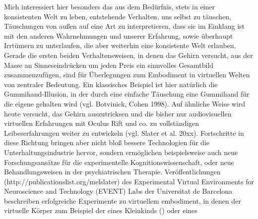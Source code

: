 \documentclass[a4paper]{article}
\begin{document}
Mich interessiert hier besonders das aus dem Bedürfnis, stets in einer konsistenten Welt zu leben, entstehende Verhalten, uns selbst zu täuschen, Täuschungen von außen auf eine Art zu interpretieren, dass sie im Einklang ist mit den anderen Wahrnehmungen und unserer Erfahrung, sowie überhaupt Irrtümern zu unterlaufen, die aber weiterhin eine konsistente Welt erlauben. Gerade die ersten beiden Verhaltensweisen, in denen das Gehirn versucht, aus der Masse an Sinneseindrücken um jeden Preis ein sinnvolles Gesamtbild zusammenzufügen, sind für Überlegungen zum Embodiment in virtuellen Welten von zentraler Bedeutung. Ein klassisches Beispiel ist hier natürlich die Gummihand-Illusion, in der durch eine einfache Täuschung eine Gummihand für die eigene gehalten wird (vgl. Botvinick, Cohen 1998). Auf ähnliche Weise wird heute versucht, das Gehirn auszutricksen und die bisher nur audiovisuellen virtuellen Erfahrungen mit Oculus Rift und co. zu vollständigen Leibeserfahrungen weiter zu entwickeln (vgl. Slater et al. 20xx). Fortschritte in diese Richtung bringen aber nicht bloß bessere Technologien für die Unterhaltungsindustrie hervor, sondern ermöglichen beispielsweise auch neue Forschungsansätze für die experimentelle Kognitionswissenschaft, oder neue Behandlungsweisen in der psychiatrischen Therapie. Veröffentlichungen (http://publicationslist.org/melslater) des Experimental Virtual Environments for Neuroscience and Technology (EVENT) Labs der Universitat de Barcelona beschreiben erfolgreiche Experimente zu virtuellem embodiment, in denen der virtuelle Körper zum Beispiel der eines Kleinkinds () oder eines 

\nocite{*}


\end{document}
